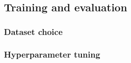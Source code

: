 \subsection{Training and evaluation}
	\subsubsection{Dataset choice}
	\subsubsection{Hyperparameter tuning}
